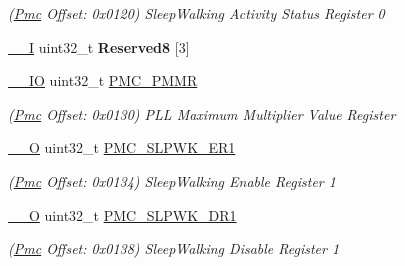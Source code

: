 \begin{DoxyCompactItemize}
\begin{DoxyCompactList}\small\item\em (\mbox{\hyperlink{structPmc}{Pmc}} Offset\+: 0x0120) Sleep\+Walking Activity Status Register 0 \end{DoxyCompactList}\item 
\mbox{\label{structPmc_a124d51ffe60663ad79931b13b08e748b}} 
\mbox{\hyperlink{core__cm7_8h_af63697ed9952cc71e1225efe205f6cd3}{\+\_\+\+\_\+I}} uint32\+\_\+t {\bfseries Reserved8} \mbox{[}3\mbox{]}
\item 
\mbox{\label{structPmc_a04a90ec2c3998d6659b7446bd48138dd}} 
\mbox{\hyperlink{core__cm7_8h_aec43007d9998a0a0e01faede4133d6be}{\+\_\+\+\_\+\+IO}} uint32\+\_\+t \mbox{\hyperlink{structPmc_a04a90ec2c3998d6659b7446bd48138dd}{P\+M\+C\+\_\+\+P\+M\+MR}}
\begin{DoxyCompactList}\small\item\em (\mbox{\hyperlink{structPmc}{Pmc}} Offset\+: 0x0130) P\+LL Maximum Multiplier Value Register \end{DoxyCompactList}\item 
\mbox{\label{structPmc_a3f13f1fbad24ddd8c9171f947836ebf3}} 
\mbox{\hyperlink{core__cm7_8h_a7e25d9380f9ef903923964322e71f2f6}{\+\_\+\+\_\+O}} uint32\+\_\+t \mbox{\hyperlink{structPmc_a3f13f1fbad24ddd8c9171f947836ebf3}{P\+M\+C\+\_\+\+S\+L\+P\+W\+K\+\_\+\+E\+R1}}
\begin{DoxyCompactList}\small\item\em (\mbox{\hyperlink{structPmc}{Pmc}} Offset\+: 0x0134) Sleep\+Walking Enable Register 1 \end{DoxyCompactList}\item 
\mbox{\label{structPmc_ac25775db2a1c9e0f5267b39cf25a9ec7}} 
\mbox{\hyperlink{core__cm7_8h_a7e25d9380f9ef903923964322e71f2f6}{\+\_\+\+\_\+O}} uint32\+\_\+t \mbox{\hyperlink{structPmc_ac25775db2a1c9e0f5267b39cf25a9ec7}{P\+M\+C\+\_\+\+S\+L\+P\+W\+K\+\_\+\+D\+R1}}
\begin{DoxyCompactList}\small\item\em (\mbox{\hyperlink{structPmc}{Pmc}} Offset\+: 0x0138) Sleep\+Walking Disable Register 1 \end{DoxyCompactList}\item 
\mbox{\label{structPmc_a7825a9816e20d11f38b8f22631613d8a}} 

\end{DoxyCompactItemize}
